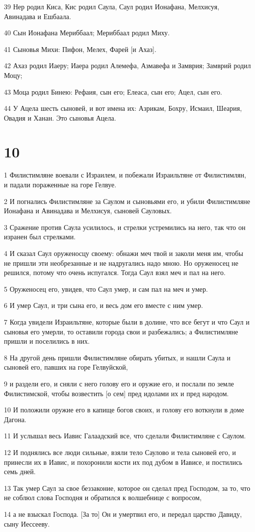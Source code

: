 \par 39 Нер родил Киса, Кис родил Саула, Саул родил Ионафана, Мелхисуя, Авинадава и Ешбаала.
\par 40 Сын Ионафана Мериббаал; Мериббаал родил Миху.
\par 41 Сыновья Михи: Пифон, Мелех, Фарей [и Ахаз].
\par 42 Ахаз родил Иаеру; Иаера родил Алемефа, Азмавефа и Замврия; Замврий родил Моцу;
\par 43 Моца родил Бинею: Рефаия, сын его; Елеаса, сын его; Ацел, сын его.
\par 44 У Ацела шесть сыновей, и вот имена их: Азрикам, Бохру, Исмаил, Шеария, Овадия и Ханан. Это сыновья Ацела.

\chapter{10}

\par 1 Филистимляне воевали с Израилем, и побежали Израильтяне от Филистимлян, и падали пораженные на горе Гелвуе.
\par 2 И погнались Филистимляне за Саулом и сыновьями его, и убили Филистимляне Ионафана и Авинадава и Мелхисуя, сыновей Сауловых.
\par 3 Сражение против Саула усилилось, и стрелки устремились на него, так что он изранен был стрелками.
\par 4 И сказал Саул оруженосцу своему: обнажи меч твой и заколи меня им, чтобы не пришли эти необрезанные и не надругались надо мною. Но оруженосец не решился, потому что очень испугался. Тогда Саул взял меч и пал на него.
\par 5 Оруженосец его, увидев, что Саул умер, и сам пал на меч и умер.
\par 6 И умер Саул, и три сына его, и весь дом его вместе с ним умер.
\par 7 Когда увидели Израильтяне, которые были в долине, что все бегут и что Саул и сыновья его умерли, то оставили города свои и разбежались; а Филистимляне пришли и поселились в них.
\par 8 На другой день пришли Филистимляне обирать убитых, и нашли Саула и сыновей его, павших на горе Гелвуйской,
\par 9 и раздели его, и сняли с него голову его и оружие его, и послали по земле Филистимской, чтобы возвестить [о сем] пред идолами их и пред народом.
\par 10 И положили оружие его в капище богов своих, и голову его воткнули в доме Дагона.
\par 11 И услышал весь Иавис Галаадский все, что сделали Филистимляне с Саулом.
\par 12 И поднялись все люди сильные, взяли тело Саулово и тела сыновей его, и принесли их в Иавис, и похоронили кости их под дубом в Иависе, и постились семь дней.
\par 13 Так умер Саул за свое беззаконие, которое он сделал пред Господом, за то, что не соблюл слова Господня и обратился к волшебнице с вопросом,
\par 14 а не взыскал Господа. [За то] Он и умертвил его, и передал царство Давиду, сыну Иессееву.

